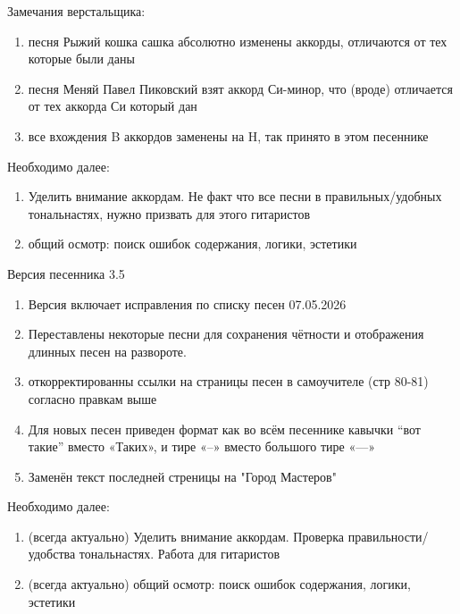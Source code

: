 \documentclass[fleqn,a5paper,12pt,twoside]{guitartabs}
\begin{document}
Замечания верстальщика: 
\begin{enumerate}
\item песня Рыжий кошка сашка абсолютно изменены аккорды, отличаются от тех которые были даны
\item песня Меняй Павел Пиковский взят аккорд Си-минор, что (вроде) отличается от тех аккорда Си который дан
\item все вхождения B аккордов заменены на H, так принято в этом песеннике
\end{enumerate}
Необходимо далее:
\begin{enumerate}
\item Уделить внимание аккордам. Не факт что все песни в правильных/удобных тональнастях, нужно призвать для этого гитаристов
\item общий осмотр: поиск ошибок содержания, логики, эстетики
\end{enumerate}
\newpage
Версия песенника 3.5
\begin{enumerate}
\item Версия включает исправления по списку песен 07.05.2026
\item Переставлены некоторые песни для сохранения чётности и отображения длинных песен на развороте.
\item откорректированны ссылки на страницы песен в самоучителе (стр 80-81) согласно правкам выше
\item Для новых песен приведен формат как во всём песеннике кавычки ``вот такие'' вместо «Таких», и тире «--» вместо большого тире «—»
\item Заменён текст последней стреницы на "Город Мастеров"
\end{enumerate}
Необходимо далее:
\begin{enumerate}
\item (всегда актуально) Уделить внимание аккордам. Проверка правильности/удобства тональнастях. Работа для гитаристов
\item (всегда актуально) общий осмотр: поиск ошибок содержания, логики, эстетики
\end{enumerate}
\newpage
\end{document}
